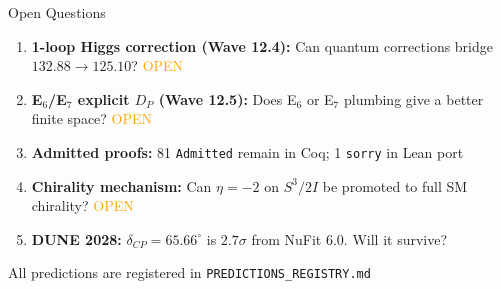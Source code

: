 \documentclass[aspectratio=169,11pt]{beamer}
\begin{document}
\begin{frame}{Open Questions}
  \begin{enumerate}
    \item \textbf{1-loop Higgs correction (Wave 12.4):} Can quantum corrections bridge $132.88 \to 125.10$? \textcolor{orange}{OPEN}
    \item \textbf{E$_6$/E$_7$ explicit $D_P$ (Wave 12.5):} Does E$_6$ or E$_7$ plumbing give a better finite space? \textcolor{orange}{OPEN}
    \item \textbf{Admitted proofs:} 81 \texttt{Admitted} remain in Coq; 1 \texttt{sorry} in Lean port
    \item \textbf{Chirality mechanism:} Can $\eta = -2$ on $S^3/2I$ be promoted to full SM chirality? \textcolor{orange}{OPEN}
    \item \textbf{DUNE 2028:} $\delta_{CP} = 65.66^\circ$ is $2.7\sigma$ from NuFit 6.0. Will it survive?
  \end{enumerate}
  \vfill
  \begin{center}
    \small All predictions are registered in \texttt{PREDICTIONS\_REGISTRY.md}
  \end{center}
\end{frame}
\end{document}
